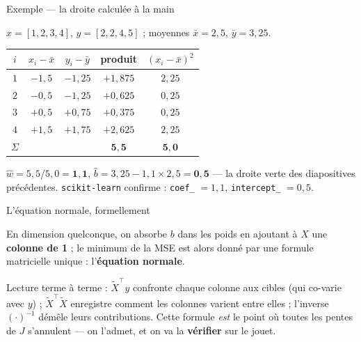 \documentclass[aspectratio=169,11pt]{beamer}
\begin{document}
\begin{frame}{Exemple — la droite calculée à la main}
\begin{ucadex}
{\footnotesize $x=[1,2,3,4]$, $y=[2,2,4,5]$ ; moyennes $\bar x = 2{,}5$, $\bar y = 3{,}25$.
\begin{center}\renewcommand{\arraystretch}{0.95}\begin{tabular}{c|cccc}
$i$ & $x_i - \bar x$ & $y_i - \bar y$ & produit & $(x_i-\bar x)^2$\\\hline
$1$ & $-1{,}5$ & $-1{,}25$ & $+1{,}875$ & $2{,}25$\\
$2$ & $-0{,}5$ & $-1{,}25$ & $+0{,}625$ & $0{,}25$\\
$3$ & $+0{,}5$ & $+0{,}75$ & $+0{,}375$ & $0{,}25$\\
$4$ & $+1{,}5$ & $+1{,}75$ & $+2{,}625$ & $2{,}25$\\\hline
$\Sigma$ & & & $\mathbf{5{,}5}$ & $\mathbf{5{,}0}$\\
\end{tabular}\end{center}
$\hat w = 5{,}5/5{,}0 = \mathbf{1{,}1}$, \quad $\hat b = 3{,}25 - 1{,}1\times 2{,}5 = \mathbf{0{,}5}$ — la droite verte des diapositives précédentes. \texttt{scikit-learn} confirme : \texttt{coef\_} $= 1{,}1$, \texttt{intercept\_} $= 0{,}5$.}
\end{ucadex}
\end{frame}

\begin{frame}{L'équation normale, formellement}
\begin{ucaddef}[Définition]
{\small En dimension quelconque, on absorbe $b$ dans les poids en ajoutant à $X$ une \textbf{colonne de 1} ; le minimum de la MSE est alors donné par une formule matricielle unique : l'\textbf{équation normale}.}
\end{ucaddef}
{\small Lecture terme à terme : $\tilde X^{\top} y$ confronte chaque colonne aux cibles (qui co-varie avec $y$) ; $\tilde X^{\top}\tilde X$ enregistre comment les colonnes varient entre elles ; l'inverse $(\cdot)^{-1}$ démêle leurs contributions. Cette formule \emph{est} le point où toutes les pentes de $J$ s'annulent — on l'admet, et on va la \textbf{vérifier} sur le jouet.}
\end{frame}
\end{document}
